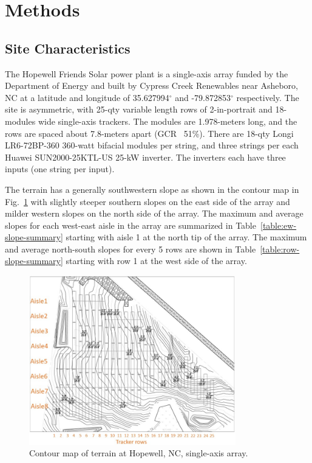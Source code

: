 \documentclass[conference]{IEEEtran}
\begin{document}
\section{Methods}

\subsection{Site Characteristics}

The Hopewell Friends Solar power plant is a single-axis array funded by the Department of Energy and built by Cypress Creek Renewables \cite{CypressCreekRenewables2019} near Asheboro, NC at a latitude and longitude of 35.627994$^\circ$ and -79.872853$^\circ$ respectively. The site is asymmetric, with 25-qty variable length rows of 2-in-portrait and 18-modules wide single-axis trackers. The modules are 1.978-meters long, and the rows are spaced about 7.8-meters apart (GCR ~51\%). There are 18-qty Longi LR6-72BP-360 360-watt bifacial modules per string, and three strings per each Huawei SUN2000-25KTL-US 25-kW inverter. The inverters each have three inputs (one string per input).

The terrain has a generally southwestern slope as shown in the contour map in Fig.~\ref{fig:hopewell_contour_map} with slightly steeper southern slopes on the east side of the array and milder western slopes on the north side of the array. The maximum and average slopes for each west-east aisle in the array are summarized in Table~\ref{table:ew-slope-summary} starting with aisle 1 at the north tip of the array. The maximum and average north-south slopes for every 5 rows are shown in Table~\ref{table:row-slope-summary} starting with row 1 at the west side of the array.

\begin{figure}[htbp]
\centerline{\includegraphics[width=9cm]{Hopewell_Civil_Base.jpg}}
\caption{Contour map of terrain at Hopewell, NC, single-axis array.}
\label{fig:hopewell_contour_map}
\end{figure}
\end{document}
